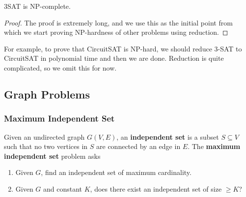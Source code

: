 \documentclass{article}
\begin{document}
    \begin{theorem}
      3SAT is NP-complete. 
    \end{theorem} 
    \begin{proof}
      The proof is extremely long, and we use this as the initial point from which we start proving NP-hardness of other problems using reduction. 
    \end{proof}

    For example, to prove that CircuitSAT is NP-hard, we should reduce 3-SAT to CircuitSAT in polynomial time and then we are done. Reduction is quite complicated, so we omit this for now. 

  \subsection{Graph Problems}

    \subsubsection{Maximum Independent Set}

      \begin{definition}[MIS]
        Given an undirected graph $G(V, E)$, an \textbf{independent set} is a subset $S \subseteq V$ such that no two vertices in $S$ are connected by an edge in $E$. The \textbf{maximum independent set} problem asks 
        \begin{enumerate}
          \item Given $G$, find an independent set of maximum cardinality. 
          \item Given $G$ and constant $K$, does there exist an independent set of size $\geq K$? 
        \end{enumerate}
      \end{definition}
\end{document}
